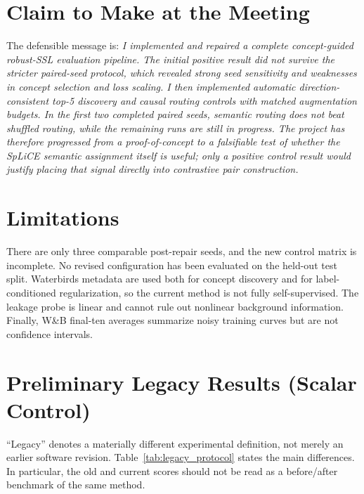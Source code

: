 \documentclass[11pt,a4paper]{article}
\begin{document}
\section{Claim to Make at the Meeting}

The defensible message is: \emph{I implemented and repaired a complete
concept-guided robust-SSL evaluation pipeline. The initial positive result did
not survive the stricter paired-seed protocol, which revealed strong seed
sensitivity and weaknesses in concept selection and loss scaling. I then
implemented automatic direction-consistent top-5 discovery and causal routing
controls with matched augmentation budgets. In the first two completed paired
seeds, semantic routing does not beat shuffled routing, while the remaining
runs are still in progress. The project has therefore progressed from a
proof-of-concept to a falsifiable test of whether the SpLiCE semantic assignment
itself is useful; only a positive control result would justify placing that
signal directly into contrastive pair construction.}

\section{Limitations}

There are only three comparable post-repair seeds, and the new control matrix
is incomplete. No revised configuration
has been evaluated on the held-out test split. Waterbirds metadata are used both
for concept discovery and for
label-conditioned regularization, so the current method is not fully
self-supervised. The leakage probe is linear and cannot rule out nonlinear
background information. Finally, W\&B final-ten averages summarize noisy
training curves but are not confidence intervals.

\FloatBarrier
\appendix

\section{Preliminary Legacy Results (Scalar Control)}

``Legacy'' denotes a materially different experimental definition, not merely
an earlier software revision. Table~\ref{tab:legacy_protocol} states the main
differences. In particular, the old and current scores should not be read as a
before/after benchmark of the same method.
\end{document}
